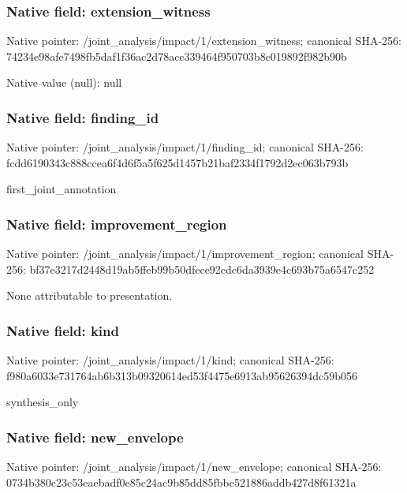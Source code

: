 \documentclass[10pt,a4paper]{article}
\begin{document}
\subsubsection{Native field: extension\_\allowbreak{}witness}
Native pointer: /joint\_\allowbreak{}analysis/impact/1/extension\_\allowbreak{}witness; canonical SHA-256: 74234e98afe7498fb5daf1f36ac2d78acc339464f950703b8c019892f982b90b

Native value (null): null

\subsubsection{Native field: finding\_\allowbreak{}id}
Native pointer: /joint\_\allowbreak{}analysis/impact/1/finding\_\allowbreak{}id; canonical SHA-256: fcdd6190343c888ccea6f4d6f5a5f625d1457b21baf2334f1792d2ec063b793b

\begingroup\raggedright\sloppy first\_\allowbreak{}joint\_\allowbreak{}annotation\par\endgroup

\subsubsection{Native field: improvement\_\allowbreak{}region}
Native pointer: /joint\_\allowbreak{}analysis/impact/1/improvement\_\allowbreak{}region; canonical SHA-256: bf37e3217d2448d19ab5ffeb99b50dfece92cdc6da3939e4c693b75a6547c252

\begingroup\raggedright\sloppy None attributable to presentation.\par\endgroup

\subsubsection{Native field: kind}
Native pointer: /joint\_\allowbreak{}analysis/impact/1/kind; canonical SHA-256: f980a6033e731764ab6b313b09320614ed53f4475e6913ab95626394dc59b056

\begingroup\raggedright\sloppy synthesis\_\allowbreak{}only\par\endgroup

\subsubsection{Native field: new\_\allowbreak{}envelope}
Native pointer: /joint\_\allowbreak{}analysis/impact/1/new\_\allowbreak{}envelope; canonical SHA-256: 0734b380c23c53eaebadf0e85c24ac9b85dd85fbbe521886addb427d8f61321a
\end{document}

